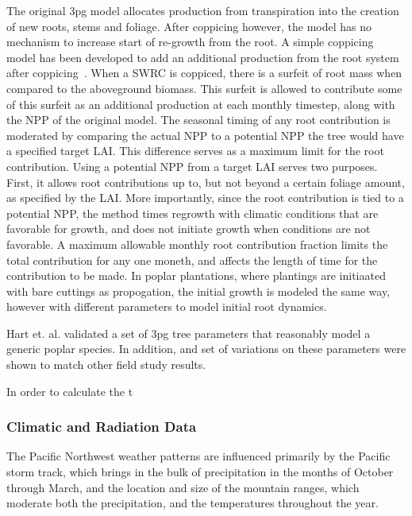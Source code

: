 \documentclass[preprint,12pt]{elsarticle}
\begin{document}
The original \ac{3pg} model allocates production from transpiration
into the creation of new roots, stems and foliage.  After coppicing
however, the model has no mechanism to increase start of re-growth
from the root.  A simple coppicing model has been developed to add an
additional production from the root system after
coppicing~\cite{Hart2014}.  When a \ac{SWRC} is coppiced, there is a
surfeit of root mass when compared to the aboveground biomass.  This
surfeit is allowed to contribute some of this surfeit as an additional
production at each monthly timestep, along with the \ac{NPP} of the
original model.  The seasonal timing of any root contribution is
moderated by comparing the actual \ac{NPP} to a potential \ac{NPP} the
tree would have a specified target \ac{LAI}.  This difference serves
as a maximum limit for the root contribution.  Using a potential
\ac{NPP} from a target \ac{LAI} serves two purposes. First, it allows
root contributions up to, but not beyond a certain foliage amount, as
specified by the \ac{LAI}.  More importantly, since the root
contribution is tied to a potential \ac{NPP}, the method times
regrowth with climatic conditions that are favorable for growth, and
does not initiate growth when conditions are not favorable.  A maximum
allowable monthly root contribution fraction limits the total
contribution for any one moneth, and affects the length of time for
the contribution to be made.  In poplar plantations, where plantings
are initiaated with bare cuttings as propogation, the initial growth
is modeled the same way, however with different parameters to model
initial root dynamics.

Hart et. al. validated a set of \ac{3pg} tree parameters that
reasonably model a generic poplar species.  In addition, and set of
variations on these parameters were shown to match other field study
results.


In order to calculate the t

\subsubsection{Climatic and Radiation Data}
\label{sec:climate}


The Pacific Northwest weather patterns are influenced primarily by the
Pacific storm track, which brings in the bulk of precipitation in the
months of October through March, and the location and size of the
mountain ranges, which moderate both the precipitation, and the
temperatures throughout the year.
\end{document}
